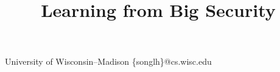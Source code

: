 \documentclass[10pt]{sigplanconf}
\begin{document}
\title{
  Learning from Big Security
}



           {University of Wisconsin--Madison}
           {\{songlh\}@cs.wisc.edu}
\maketitle
\begin{abstract}

\end{abstract}








%
%


\balance
{

 
}
\end{document}
